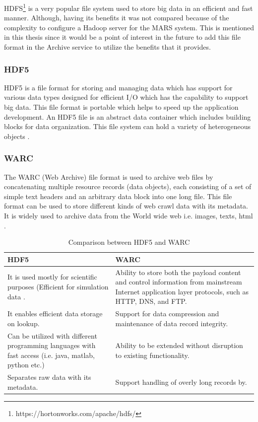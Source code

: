 HDFS\footnote{https://hortonworks.com/apache/hdfs/} is a very popular file system used to store big data in an efficient and fast manner. 
Although, having its benefits it was not compared because of the complexity to configure a Hadoop server for the MARS system. This is mentioned in this thesis since it would be
a point of interest in the future to add this file format in the Archive service to utilize the benefits that it provides.

\subsubsection{HDF5}
HDF5 is a file format for storing and managing data which has support for various data types designed for
efficient I/O which has the capability to support big data. This file format is portable which helps to speed
up the application development. An HDF5 file is an abstract data container which includes building blocks for data organization. This file
system can hold a variety of heterogeneous objects \cite{Savic2007}. 

\subsubsection{WARC}
The WARC (Web Archive) file format is used to archive web files by concatenating multiple resource records
(data objects), each consisting of a set of simple text headers and an arbitrary data block into one long file.
This file format can be used to store different kinds of web crawl data with its metadata. It is widely used
 to archive data from the World wide web i.e. images, texts, html \cite{WARC}.

 \begin{table}[H]
    \centering
    \begin{tabular}{|p{7.5cm}|p{7.5cm}|}
        \hline
            \textbf{HDF5}  & \textbf{WARC}\\
        \hline
            It is used mostly for scientific purposes (Efficient
            for simulation data \cite[p.~11]{Savic2007}. & 
            Ability to store both the payload content and control information from mainstream Internet application layer protocols, such as
            HTTP, DNS, and FTP. \\
        \hline
            It enables efficient data storage on lookup.
            &  
            Support for data compression and maintenance of
             data record integrity.\\
        \hline
        Can be utilized with different programming languages with fast access (i.e. java, matlab, python etc.) &  
                Ability to be extended without disruption
                to existing functionality.\\
        \hline
        Separates raw data with its metadata. & Support handling of overly long records by. \\        
        \hline
        
        \hline
    \end{tabular}
    \caption{Comparison between HDF5 and WARC}
    \label{table:Hdf5vsWARC}     
\end{table} 

